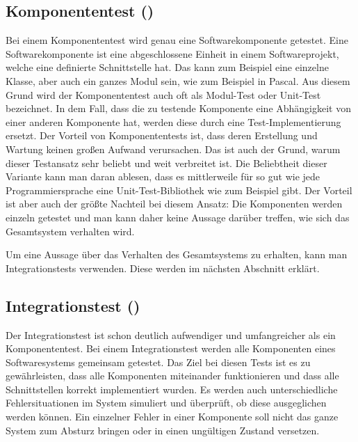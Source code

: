 \subsection{Komponententest ()}

Bei einem Komponententest \cite{xUnit} wird genau eine Softwarekomponente getestet. Eine Softwarekomponente ist eine abgeschlossene Einheit in einem Softwareprojekt, welche eine definierte Schnittstelle hat. Das kann zum Beispiel eine einzelne Klasse, aber auch ein ganzes Modul sein, wie zum Beispiel in Pascal. Aus diesem Grund wird der Komponententest auch oft als Modul-Test oder Unit-Test bezeichnet. In dem Fall, dass die zu testende Komponente eine Abhängigkeit von einer anderen Komponente hat, werden diese durch eine Test-Implementierung ersetzt. Der Vorteil von Komponententests ist, dass deren Erstellung und Wartung keinen großen Aufwand verursachen. Das ist auch der Grund, warum dieser Testansatz sehr beliebt und weit verbreitet ist. Die Beliebtheit dieser Variante kann man daran ablesen, dass es mittlerweile für so gut wie jede Programmiersprache eine Unit-Test-Bibliothek wie zum Beispiel  \cite{JUnit} gibt. Der Vorteil ist aber auch der größte Nachteil bei diesem Ansatz: Die Komponenten werden einzeln getestet und man kann daher keine Aussage darüber treffen, wie sich das Gesamtsystem verhalten wird.

\SuperPar
Um eine Aussage über das Verhalten des Gesamtsystems zu erhalten, kann man Integrationstests verwenden. Diese werden im nächsten Abschnitt erklärt.

\subsection{Integrationstest ()}

Der Integrationstest ist schon deutlich aufwendiger und umfangreicher als ein Komponententest. Bei einem Integrationstest werden alle Komponenten eines Softwaresystems gemeinsam getestet. Das Ziel bei diesen Tests ist es zu gewährleisten, dass alle Komponenten miteinander funktionieren und dass alle Schnittstellen korrekt implementiert wurden. Es werden auch unterschiedliche Fehlersituationen im System simuliert und überprüft, ob diese ausgeglichen werden können. Ein einzelner Fehler in einer Komponente soll nicht das ganze System zum Absturz bringen oder in einen ungültigen Zustand versetzen.

